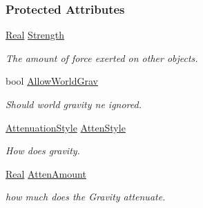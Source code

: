 \subsubsection*{Protected Attributes}
\begin{DoxyCompactItemize}
\item 
\hypertarget{classphys_1_1GravityWell_acc6e405d39cdc6017040902190e16652}{
\hyperlink{namespacephys_af7eb897198d265b8e868f45240230d5f}{Real} \hyperlink{classphys_1_1GravityWell_acc6e405d39cdc6017040902190e16652}{Strength}}
\label{d6/d21/classphys_1_1GravityWell_acc6e405d39cdc6017040902190e16652}

\begin{DoxyCompactList}\small\item\em The amount of force exerted on other objects. \item\end{DoxyCompactList}\item 
\hypertarget{classphys_1_1GravityWell_a8b7106e7670a7bc074c245269d211ba0}{
bool \hyperlink{classphys_1_1GravityWell_a8b7106e7670a7bc074c245269d211ba0}{AllowWorldGrav}}
\label{d6/d21/classphys_1_1GravityWell_a8b7106e7670a7bc074c245269d211ba0}

\begin{DoxyCompactList}\small\item\em Should world gravity ne ignored. \item\end{DoxyCompactList}\item 
\hypertarget{classphys_1_1GravityWell_a13fda8d3a831a6eba5fd2e03ef2dbcfc}{
\hyperlink{classphys_1_1GravityWell_a72d0da5f140b91bc364f2c46e7536e1f}{AttenuationStyle} \hyperlink{classphys_1_1GravityWell_a13fda8d3a831a6eba5fd2e03ef2dbcfc}{AttenStyle}}
\label{d6/d21/classphys_1_1GravityWell_a13fda8d3a831a6eba5fd2e03ef2dbcfc}

\begin{DoxyCompactList}\small\item\em How does gravity. \item\end{DoxyCompactList}\item 
\hypertarget{classphys_1_1GravityWell_ad9fd8f2f2dea6a53241ef90852e84503}{
\hyperlink{namespacephys_af7eb897198d265b8e868f45240230d5f}{Real} \hyperlink{classphys_1_1GravityWell_ad9fd8f2f2dea6a53241ef90852e84503}{AttenAmount}}
\label{d6/d21/classphys_1_1GravityWell_ad9fd8f2f2dea6a53241ef90852e84503}

\begin{DoxyCompactList}\small\item\em how much does the Gravity attenuate. \item\end{DoxyCompactList}\end{DoxyCompactItemize}


